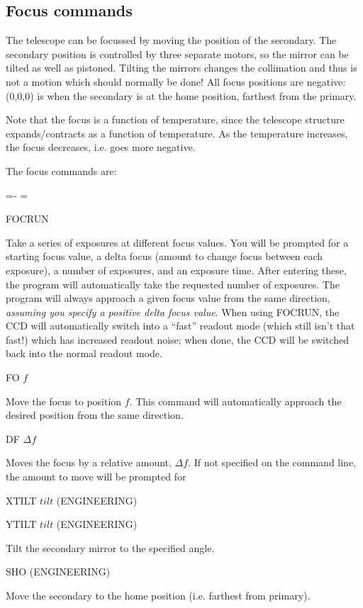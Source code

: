 \documentclass[10pt]{report}
\newenvironment{hanging}{
	\begin{list}{}{
		\labelsep=0pt
		\labelwidth=0pt
		\listparindent=0pt
		\itemindent=-\leftmargini
		\leftmargin=\leftmargini
	}
}{
	\end{list}
}
\begin{document}
\subsection{Focus commands}

The telescope can be focussed by moving the position of the secondary. 
The secondary position is controlled by three separate motors, so the
mirror can be tilted as well as pistoned. Tilting the mirrors changes
the collimation and thus is not a motion which should normally be
done! All focus positions are negative: (0,0,0) is when the secondary
is at the home position, farthest from the primary.

Note that the focus is a function of temperature, since the telescope
structure expands/contracts as a function of temperature. As the
temperature increases, the focus decreases, i.e. goes more negative.

The focus commands are:

\begin{hanging}
\item{FOCRUN}

Take a series of exposures at different focus values. You will be prompted
for a starting focus value, a delta focus (amount to change focus between
each exposure), a number of exposures, and an exposure time. After entering
these, the program will automatically take the requested number of exposures.
The program will always approach a given focus value from the same direction,
\textit{assuming you specify a positive delta focus value}. When using
FOCRUN, the CCD will automatically switch into a ``fast'' readout mode
(which still isn't that fast!) which has increased readout noise; 
when done, the CCD will be switched back into the normal readout mode.

\item{FO {$f$}}

Move the focus to position $f$. This command will automatically approach
the desired position from the same direction.

\item{DF {$\Delta f$}}

Moves the focus by a relative amount, $\Delta f$. If not specified on the
command line, the amount to move will be prompted for

\item{XTILT $tilt$ (ENGINEERING)}
\item{YTILT $tilt$ (ENGINEERING)}

Tilt the secondary mirror to the specified angle.

\item{SHO (ENGINEERING)}

Move the secondary to the home position (i.e. farthest from primary).

\end{hanging}
\end{document}

